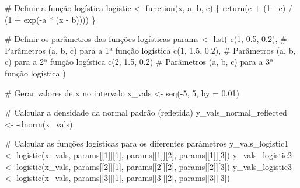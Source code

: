 \documentclass[
  letterpaper,
  DIV=11,
  numbers=noendperiod]{scrreprt}
\newenvironment{Shaded}{\begin{snugshade}}{\end{snugshade}}
\newcommand{\AttributeTok}[1]{\textcolor[rgb]{0.40,0.45,0.13}{#1}}
\newcommand{\CommentTok}[1]{\textcolor[rgb]{0.37,0.37,0.37}{#1}}
\newcommand{\ControlFlowTok}[1]{\textcolor[rgb]{0.00,0.23,0.31}{#1}}
\newcommand{\DecValTok}[1]{\textcolor[rgb]{0.68,0.00,0.00}{#1}}
\newcommand{\FloatTok}[1]{\textcolor[rgb]{0.68,0.00,0.00}{#1}}
\newcommand{\FunctionTok}[1]{\textcolor[rgb]{0.28,0.35,0.67}{#1}}
\newcommand{\NormalTok}[1]{\textcolor[rgb]{0.00,0.23,0.31}{#1}}
\newcommand{\OtherTok}[1]{\textcolor[rgb]{0.00,0.23,0.31}{#1}}
\newcommand{\SpecialCharTok}[1]{\textcolor[rgb]{0.37,0.37,0.37}{#1}}
\begin{document}
\begin{Shaded}
\begin{Highlighting}[]
\CommentTok{\# Definir a função logística}
\NormalTok{logistic }\OtherTok{\textless{}{-}} \ControlFlowTok{function}\NormalTok{(x, a, b, c) \{}
  \FunctionTok{return}\NormalTok{(c }\SpecialCharTok{+}\NormalTok{ (}\DecValTok{1} \SpecialCharTok{{-}}\NormalTok{ c) }\SpecialCharTok{/}\NormalTok{ (}\DecValTok{1} \SpecialCharTok{+} \FunctionTok{exp}\NormalTok{(}\SpecialCharTok{{-}}\NormalTok{a }\SpecialCharTok{*}\NormalTok{ (x }\SpecialCharTok{{-}}\NormalTok{ b))))}
\NormalTok{\}}

\CommentTok{\# Definir os parâmetros das funções logísticas}
\NormalTok{params }\OtherTok{\textless{}{-}} \FunctionTok{list}\NormalTok{(}
  \FunctionTok{c}\NormalTok{(}\DecValTok{1}\NormalTok{, }\FloatTok{0.5}\NormalTok{, }\FloatTok{0.2}\NormalTok{),  }\CommentTok{\# Parâmetros (a, b, c) para a 1ª função logística}
  \FunctionTok{c}\NormalTok{(}\DecValTok{1}\NormalTok{, }\FloatTok{1.5}\NormalTok{, }\FloatTok{0.2}\NormalTok{),  }\CommentTok{\# Parâmetros (a, b, c) para a 2ª função logística}
  \FunctionTok{c}\NormalTok{(}\DecValTok{2}\NormalTok{, }\FloatTok{1.5}\NormalTok{, }\FloatTok{0.2}\NormalTok{)   }\CommentTok{\# Parâmetros (a, b, c) para a 3ª função logística}
\NormalTok{)}

\CommentTok{\# Gerar valores de x no intervalo}
\NormalTok{x\_vals }\OtherTok{\textless{}{-}} \FunctionTok{seq}\NormalTok{(}\SpecialCharTok{{-}}\DecValTok{5}\NormalTok{, }\DecValTok{5}\NormalTok{, }\AttributeTok{by =} \FloatTok{0.01}\NormalTok{)}

\CommentTok{\# Calcular a densidade da normal padrão (refletida)}
\NormalTok{y\_vals\_normal\_reflected }\OtherTok{\textless{}{-}} \SpecialCharTok{{-}}\FunctionTok{dnorm}\NormalTok{(x\_vals)}

\CommentTok{\# Calcular as funções logísticas para os diferentes parâmetros}
\NormalTok{y\_vals\_logistic1 }\OtherTok{\textless{}{-}} \FunctionTok{logistic}\NormalTok{(x\_vals, params[[}\DecValTok{1}\NormalTok{]][}\DecValTok{1}\NormalTok{], params[[}\DecValTok{1}\NormalTok{]][}\DecValTok{2}\NormalTok{], params[[}\DecValTok{1}\NormalTok{]][}\DecValTok{3}\NormalTok{])}
\NormalTok{y\_vals\_logistic2 }\OtherTok{\textless{}{-}} \FunctionTok{logistic}\NormalTok{(x\_vals, params[[}\DecValTok{2}\NormalTok{]][}\DecValTok{1}\NormalTok{], params[[}\DecValTok{2}\NormalTok{]][}\DecValTok{2}\NormalTok{], params[[}\DecValTok{2}\NormalTok{]][}\DecValTok{3}\NormalTok{])}
\NormalTok{y\_vals\_logistic3 }\OtherTok{\textless{}{-}} \FunctionTok{logistic}\NormalTok{(x\_vals, params[[}\DecValTok{3}\NormalTok{]][}\DecValTok{1}\NormalTok{], params[[}\DecValTok{3}\NormalTok{]][}\DecValTok{2}\NormalTok{], params[[}\DecValTok{3}\NormalTok{]][}\DecValTok{3}\NormalTok{])}


\end{Highlighting}
\end{Shaded}
\end{document}
